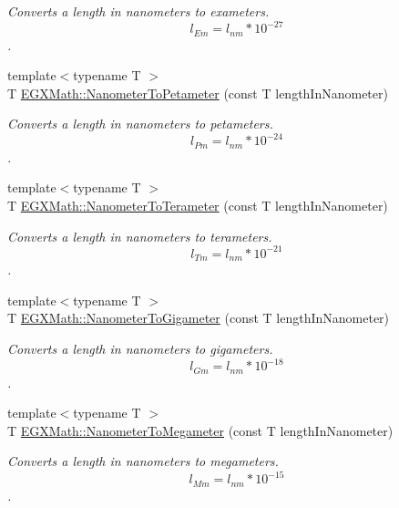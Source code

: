 \begin{DoxyCompactItemize}
\begin{DoxyCompactList}\small\item\em Converts a length in nanometers to exameters. \[ l_{Em}=l_{nm} * 10^{-27} \]. \end{DoxyCompactList}\item 
{\footnotesize template$<$typename T $>$ }\\T \mbox{\hyperlink{group___e_g_x_math-_conversions-_length_conversions-_s_i-_nanometer-_s_i_ga61c4ec1200cb2e909920c108d676d6e6}{E\+G\+X\+Math\+::\+Nanometer\+To\+Petameter}} (const T length\+In\+Nanometer)
\begin{DoxyCompactList}\small\item\em Converts a length in nanometers to petameters. \[ l_{Pm}=l_{nm} * 10^{-24} \]. \end{DoxyCompactList}\item 
{\footnotesize template$<$typename T $>$ }\\T \mbox{\hyperlink{group___e_g_x_math-_conversions-_length_conversions-_s_i-_nanometer-_s_i_gacca577403e34659fd6bccf40885704fc}{E\+G\+X\+Math\+::\+Nanometer\+To\+Terameter}} (const T length\+In\+Nanometer)
\begin{DoxyCompactList}\small\item\em Converts a length in nanometers to terameters. \[ l_{Tm}=l_{nm} * 10^{-21} \]. \end{DoxyCompactList}\item 
{\footnotesize template$<$typename T $>$ }\\T \mbox{\hyperlink{group___e_g_x_math-_conversions-_length_conversions-_s_i-_nanometer-_s_i_ga235d244736444af6437d9086ae1f485d}{E\+G\+X\+Math\+::\+Nanometer\+To\+Gigameter}} (const T length\+In\+Nanometer)
\begin{DoxyCompactList}\small\item\em Converts a length in nanometers to gigameters. \[ l_{Gm}=l_{nm} * 10^{-18} \]. \end{DoxyCompactList}\item 
{\footnotesize template$<$typename T $>$ }\\T \mbox{\hyperlink{group___e_g_x_math-_conversions-_length_conversions-_s_i-_nanometer-_s_i_gabe3584b4139cea97ebc372abf99fc63e}{E\+G\+X\+Math\+::\+Nanometer\+To\+Megameter}} (const T length\+In\+Nanometer)
\begin{DoxyCompactList}\small\item\em Converts a length in nanometers to megameters. \[ l_{Mm}=l_{nm} * 10^{-15} \]. \end{DoxyCompactList}\item 

\end{DoxyCompactItemize}
